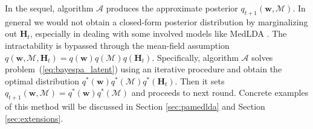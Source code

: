 \documentclass[twoside,11pt]{article}
\newcommand{\Hv}{\bm{H}}
\newcommand{\algo}{\mathcal{A}}
\newcommand{\wv}{\bm{w}}
\newcommand{\Mv}{\bm{\mathcal{M}}}
\begin{document}

%
%

In the sequel, algorithm $\algo$ produces the approximate posterior $q_{t+1}(\wv, \Mv)$. In general we would not obtain a closed-form posterior distribution by marginalizing out $\Hv_t$, especially in dealing with some involved models like MedLDA \citep{zhu2012medlda}. The intractability is bypassed through the mean-field assumption $q(\wv, \Mv, \Hv_t) = q(\wv) q(\Mv) q(\Hv_t)$. Specifically, algorithm $\algo$ solves problem~(\ref{eq:bayespa_latent}) using an iterative procedure and obtain the optimal distribution $q^*(\wv) q^*(\Mv) q^*(\Hv_t)$. Then it sets $q_{t+1}(\wv, \Mv) = q^*(\wv) q^*(\Mv)$ and proceeds to next round. Concrete examples of this method will be discussed in Section \ref{sec:pamedlda} and Section \ref{sec:extensions}.
\end{document}
